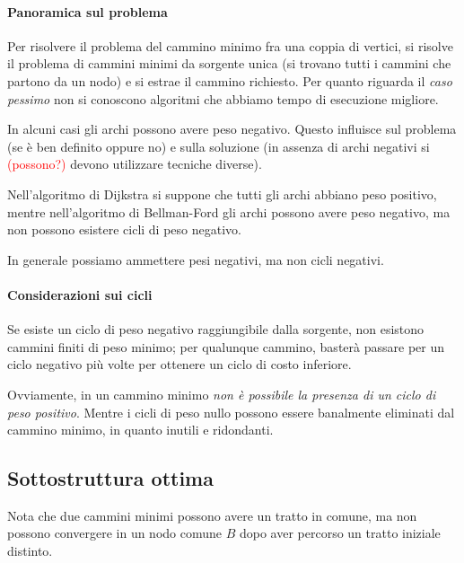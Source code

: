 \paragraph{Panoramica sul problema}

Per risolvere il problema del cammino minimo fra una coppia di vertici, si risolve il problema di cammini minimi da sorgente unica (si trovano tutti i cammini che partono da un nodo) e si estrae il cammino richiesto.
Per quanto riguarda il \emph{caso pessimo} non si conoscono algoritmi che abbiamo tempo di esecuzione migliore.

In alcuni casi gli archi possono avere peso negativo. Questo influisce sul problema (se è ben definito oppure no) e sulla soluzione (in assenza di archi negativi si \textcolor{red}{(possono?)} devono utilizzare tecniche diverse).

Nell'algoritmo di Dijkstra si suppone che tutti gli archi abbiano peso positivo, mentre nell'algoritmo di Bellman-Ford gli archi possono avere peso negativo, ma non possono esistere cicli di peso negativo.

\begin{note}
In generale possiamo ammettere pesi negativi, ma non cicli negativi.
\end{note}

\paragraph{Considerazioni sui cicli}
Se esiste un ciclo di peso negativo raggiungibile dalla sorgente, non esistono cammini finiti di peso minimo;
per qualunque cammino, basterà passare per un ciclo negativo più volte per ottenere un ciclo di costo inferiore.

Ovviamente, in un cammino minimo \emph{non è possibile la presenza di un ciclo di peso positivo}.
Mentre i cicli di peso nullo possono essere banalmente eliminati dal cammino minimo, in quanto inutili e ridondanti.

\subsection{Sottostruttura ottima}

Nota che due cammini minimi possono avere un tratto in comune, ma non possono convergere in un nodo comune \(B\) dopo aver percorso un tratto iniziale distinto.

